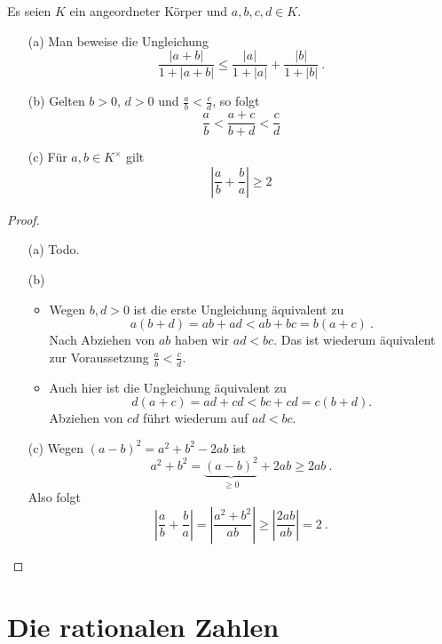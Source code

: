 \setcounter{aufgabe}{9}
\begin{aufgabe}
	Es seien $K$ ein angeordneter Körper und $a, b, c, d \in K$.
	\begin{enumerate}
		\item[(a)] Man beweise die Ungleichung
			\[
				\frac{| a + b|}{1 + |a+b|} \leq \frac{|a|}{1+|a|} + \frac{|b|}{1+|b|} \ .
			\]
		\item[(b)] Gelten $b > 0$, $d > 0$ und $\frac a b < \frac c d$, so folgt
			\[
				\frac a b < \frac{a + c}{b + d} < \frac c d
			\]
		\item[(c)] Für $a, b \in K^\times$ gilt
			\[
				\left| \frac a b + \frac b a \right| \geq 2
			\]
	\end{enumerate}
\end{aufgabe}
\begin{proof}
	\begin{enumerate}
		\item[(a)] Todo. %
		\item[(b)] 
			\begin{itemize}
				\item Wegen $b, d > 0$ ist die erste Ungleichung äquivalent zu 
					\[
						a(b+d) = ab + ad < ab + bc = b(a+c) \ .
					\]
					Nach Abziehen von $ab$ haben wir $ad < bc$. Das ist wiederum äquivalent
					zur Voraussetzung $\frac a b < \frac c d$.
				\item Auch hier ist die Ungleichung äquivalent zu 
					\[
						d(a+c) = ad + cd < bc + cd = c ( b+d) .
					\]
					Abziehen von $cd$ führt wiederum auf $ad < bc$.
			\end{itemize}
		\item[(c)] Wegen $(a-b)^2 = a^2 + b^2 - 2ab$ ist
			\[
				a^2 + b^2 = \underbrace{ (a-b)^2 }_{\geq 0} + 2ab \geq 2ab \ .
			\]
			Also folgt
			\[
				\left| \frac a b + \frac b a \right| = \left| \frac{a^2 + b^2}{ab} \right|
					\geq \left| \frac{2ab}{ab} \right| = 2 \ .
			\]
	\end{enumerate}

\end{proof}

\section{Die rationalen Zahlen}
